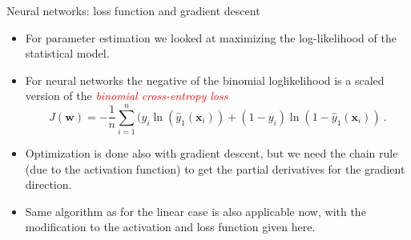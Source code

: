 \documentclass[10pt,ignorenonframetext,]{beamer}
\begin{document}
\begin{frame}

\begin{block}{Neural networks: loss function and gradient descent}

\vspace{2mm}

\begin{itemize}
\item
  For parameter estimation we looked at maximizing the log-likelihood of
  the statistical model.
\item
  For neural networks the negative of the binomial loglikelihood is a
  scaled version of the
  \emph{\textcolor{red}{binomial cross-entropy loss}}
  \[ J({\boldsymbol w})=-\frac{1}{n}\sum_{i=1}^n (y_i\ln({\hat{y}_1({\boldsymbol x}_i)})+(1-y_i)\ln(1-{\hat{y}_1({\boldsymbol x}_i)}) \ . \]
\item
  Optimization is done also with gradient descent, but we need the chain
  rule (due to the activation function) to get the partial derivatives
  for the gradient direction.
\item
  Same algorithm as for the linear case is also applicable now, with the
  modification to the activation and loss function given here.
\end{itemize}

\end{block}

\end{frame}
\end{document}
